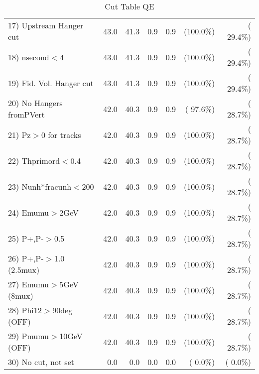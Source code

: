 \begin{table}[h!]
\begin{tabular}{||l||r|r|r|r|r|r||}
 17) Upstream Hanger cut  &         43.0 &         41.3 &          0.9 &          0.9 & (100.0\%) & ( 29.4\%) \\
 18) nsecond$<$4          &         43.0 &         41.3 &          0.9 &          0.9 & (100.0\%) & ( 29.4\%) \\
 19) Fid. Vol. Hanger cut &         43.0 &         41.3 &          0.9 &          0.9 & (100.0\%) & ( 29.4\%) \\
 20) No Hangers fromPVert &         42.0 &         40.3 &          0.9 &          0.9 & ( 97.6\%) & ( 28.7\%) \\
 21) Pz$>$0 for tracks    &         42.0 &         40.3 &          0.9 &          0.9 & (100.0\%) & ( 28.7\%) \\
 22) Thprimord$<$0.4      &         42.0 &         40.3 &          0.9 &          0.9 & (100.0\%) & ( 28.7\%) \\
 23) Nunh*fracunh$<$200   &         42.0 &         40.3 &          0.9 &          0.9 & (100.0\%) & ( 28.7\%) \\
 24) Emumu$>$2GeV         &         42.0 &         40.3 &          0.9 &          0.9 & (100.0\%) & ( 28.7\%) \\
 25) P+,P-$>$0.5          &         42.0 &         40.3 &          0.9 &          0.9 & (100.0\%) & ( 28.7\%) \\
 26) P+,P-$>$1.0 (2.5mux) &         42.0 &         40.3 &          0.9 &          0.9 & (100.0\%) & ( 28.7\%) \\
 27) Emumu$>$5GeV  (8mux) &         42.0 &         40.3 &          0.9 &          0.9 & (100.0\%) & ( 28.7\%) \\
 28) Phi12$>$90deg  (OFF) &         42.0 &         40.3 &          0.9 &          0.9 & (100.0\%) & ( 28.7\%) \\
 29) Pmumu$>$10GeV  (OFF) &         42.0 &         40.3 &          0.9 &          0.9 & (100.0\%) & ( 28.7\%) \\
 30) No cut, not set      &          0.0 &          0.0 &          0.0 &          0.0 & (  0.0\%) & (  0.0\%) \\
 \hline
 \hline
 \end{tabular}
 \caption{Cut Table  QE       }
 \label{tab-cutheavy_neutrino_0.250}
 \end{table}
